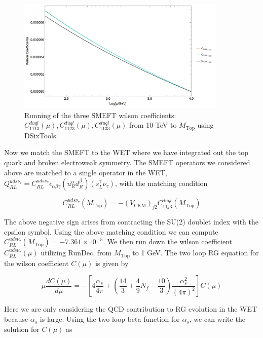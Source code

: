 \documentclass[aps,onecolumn,twoside,secnumarabic,balancelastpage,amsmath,amssymb,nofootinbib,hyperref=pdftex]{revtex4}
\begin{document}
\begin{figure}[htbp]
\begin{center}
\includegraphics[width=10cm]{smeft_running.png}
\caption{Running of the three SMEFT wilson coefficients: $C^{duql}_{1113}(\mu), C^{duql}_{1123}(\mu), C^{duql}_{1133}(\mu)$ from 10 TeV to $M_{\text{Top}}$ using DSixTools.}
\label{default}
\end{center}
\end{figure}

Now we match the SMEFT to the WET where we have integrated out the top quark and broken electroweak symmetry. The SMEFT operators we considered above are matched to a single operator in the WET, $Q^{uds\nu_{\tau}}_{RL} = C^{uds\nu_{\tau}}_{RL}\epsilon_{\alpha\beta\gamma}(u^{\alpha}_{R}d^{\beta}_{R})(s^{\gamma}_{L}\nu_{\tau})$, with the matching condition

\begin{equation}
C^{uds\nu_{\tau}}_{RL}(M_{\text{Top}}) = -(V_{\text{CKM}})_{j2}C^{duql}_{11j3}(M_{\text{Top}})
\end{equation}

The above negative sign arises from contracting the SU(2) doublet index with the epsilon symbol. Using the above matching condition we can compute $C^{uds\nu_{\tau}}_{RL}(M_{\text{Top}}) = -7.361\times10^{-5}$. We then run down the wilson coefficient $C^{uds\nu_{\tau}}_{RL}(\mu)$ utilizing RunDec\cite{RunDec},  from $M_{\text{Top}}$ to 1 GeV. The two loop RG equation for the wilson coefficient $C(\mu)$ is given by 

\begin{equation}
\mu\frac{dC(\mu)}{d\mu} = -\left[4\frac{\alpha_{s}}{4\pi} + \left(\frac{14}{3} + \frac{4}{9}N_{f}  - \frac{10}{3}\right)\frac{\alpha_{s}^{2}}{(4\pi)^2}\right]C(\mu)
\end{equation}

Here we are only considering the QCD contribution to RG evolution in the WET because $\alpha_{s}$ is large. Using the two loop beta function for $\alpha_{s}$, we can write the solution for $C(\mu)$ as
\end{document}

